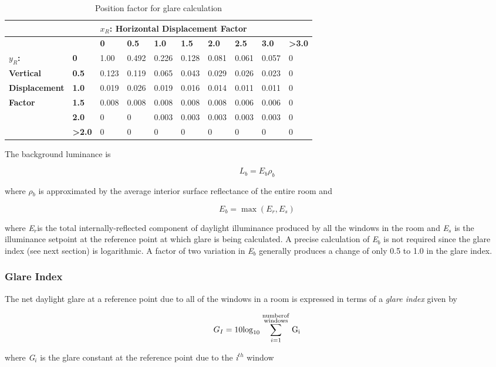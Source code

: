 \begin{longtable}[c]{p{1.0in}p{0.4in}p{0.4in}p{0.4in}p{0.4in}p{0.4in}p{0.4in}p{0.4in}p{0.4in}p{0.4in}}
\caption{Position factor for glare calculation \label{table:position-factor-for-glare-calculation}}\\
\toprule 
            &      &\multicolumn{8}{l}{$x_R$: Horizontal Displacement Factor} \tabularnewline \cmidrule(r){2-9} \endhead
            &      & \textbf{0}     & \textbf{0.5}   & \textbf{1.0}   & \textbf{1.5}   & \textbf{2.0}   & \textbf{2.5}   & \textbf{3.0}   & \textbf{>3.0} \tabularnewline
\textbf{$y_R$:}      & \textbf{0}    & 1.00  & 0.492 & 0.226 & 0.128 & 0.081 & 0.061 & 0.057 & 0 \tabularnewline
\textbf{Vertical}    & \textbf{0.5}  & 0.123 & 0.119 & 0.065 & 0.043 & 0.029 & 0.026 & 0.023 & 0 \tabularnewline
\textbf{Displacement}  & \textbf{1.0}  & 0.019 & 0.026 & 0.019 & 0.016 & 0.014 & 0.011 & 0.011 & 0 \tabularnewline
\textbf{Factor}      & \textbf{1.5}  & 0.008 & 0.008 & 0.008 & 0.008 & 0.008 & 0.006 & 0.006 & 0 \tabularnewline
            & \textbf{2.0}  & 0     & 0     & 0.003 & 0.003 & 0.003 & 0.003 & 0.003 & 0 \tabularnewline
            & \textbf{>2.0} & 0     & 0     & 0     & 0     & 0     & 0     & 0     & 0 \tabularnewline
\bottomrule
\end{longtable}

The background luminance is

\begin{equation}
{L_b} = {E_b}{\rho_b}
\end{equation}

where \emph{$\rho$\(_{b}\)} is approximated by the average interior surface reflectance of the entire room and

\begin{equation}
{E_b} = \max ({E_r},{E_s})
\end{equation}

where \emph{E\(_{r}\)}is the total internally-reflected component of daylight illuminance produced by all the windows in the room and \emph{E\(_{s}\)} is the illuminance setpoint at the reference point at which glare is being calculated. A precise calculation of \emph{E\(_{b}\)} is not required since the glare index (see next section) is logarithmic. A factor of two variation in \emph{E\(_{b}\)} generally produces a change of only 0.5 to 1.0 in the glare index.

\subsubsection{Glare Index}\label{glare-index}

The net daylight glare at a reference point due to all of the windows in a room is expressed in terms of a \emph{glare index} given by

\begin{equation}
{G_I} = 10{\log_{10}}\sum\limits_{i = 1}^{\scriptstyle{\rm{number of}}\atop\scriptstyle{\rm{windows}}} {{{\rm{G}}_{\rm{i}}}}
\end{equation}

where \emph{G\(_{i}\)} is the glare constant at the reference point due to the \emph{i\(^{th}\)} window

